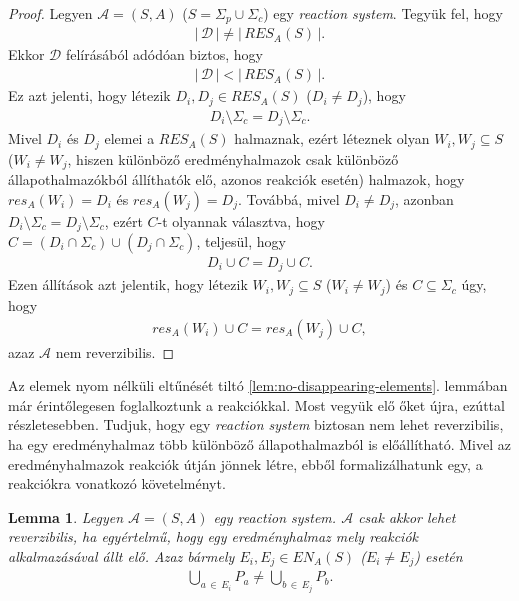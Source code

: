 \documentclass[12pt]{article}
\theoremstyle{definition}
\theoremstyle{remark}
\theoremstyle{plain}
\theoremstyle{remark}
\theoremstyle{plain}
\newtheorem{lemma}{Lemma}
\newcommand{\res}{\textit{res}}
\begin{document}
    \begin{proof}
        Legyen $\mathscr{A} = (S, A)$ ($S = \Sigma_{p} \cup \Sigma_{c}$) egy \textit{reaction system}. Tegyük fel, hogy 
        \begin{align*}
            |\,\mathcal{D}\,| \neq |\,\textit{RES}_{A}(S)\,|.
        \end{align*}
        Ekkor $\mathcal{D}$ felírásából adódóan biztos, hogy
        \begin{align*}
            |\,\mathcal{D}\,| < |\,\textit{RES}_{A}(S)\,|.
        \end{align*}
        Ez azt jelenti, hogy létezik $D_{i}, D_{j} \in \textit{RES}_{A}(S)$ ($D_{i} \neq D_{j}$), hogy
        \begin{align*}
            D_{i} \setminus \Sigma_{c} = D_{j} \setminus \Sigma_{c}.
        \end{align*}
        Mivel $D_{i}$ és $D_{j}$ elemei a $\textit{RES}_{A}(S)$ halmaznak, ezért léteznek olyan $W_{i}, W_{j} \subseteq S$ ($W_{i} \neq W_{j}$, hiszen különböző eredményhalmazok csak különböző állapothalmazókból állíthatók elő, azonos reakciók esetén) halmazok, hogy $\res_{A}(W_{i}) = D_{i}$ és $\res_{A}(W_{j}) = D_{j}$. Továbbá, mivel $D_{i} \neq D_{j}$, azonban $D_{i} \setminus \Sigma_{c} = D_{j} \setminus \Sigma_{c}$, ezért $C$-t olyannak választva, hogy $C = (D_{i} \cap \Sigma_{c}) \cup (D_{j} \cap \Sigma_{c})$, teljesül, hogy
        \begin{align*}
            D_{i} \cup C = D_{j} \cup C.
        \end{align*}
        Ezen állítások azt jelentik, hogy létezik $W_{i}, W_{j} \subseteq S$ ($W_{i} \neq W_{j}$) és $C \subseteq \Sigma_{c}$ úgy, hogy
        \begin{align*}
            \res_{A}(W_{i}) \cup C = \res_{A}(W_{j}) \cup C,
        \end{align*}
        azaz $\mathscr{A}$ nem reverzibilis.
    \end{proof}     

    Az elemek nyom nélküli eltűnését tiltó \ref{lem:no-disappearing-elements}. lemmában már érintőlegesen foglalkoztunk a reakciókkal. Most vegyük elő őket újra, ezúttal részletesebben. Tudjuk, hogy egy \textit{reaction system} biztosan nem lehet reverzibilis, ha egy eredményhalmaz több különböző állapothalmazból is előállítható. Mivel az eredményhalmazok reakciók útján jönnek létre, ebből formalizálhatunk egy, a reakciókra vonatkozó követelményt.

    \begin{lemma}\label{lem:unique-products}
        Legyen $\mathscr{A} = (S, A)$ egy \textit{reaction system}. $\mathscr{A}$ csak akkor lehet reverzibilis, ha egyértelmű, hogy egy eredményhalmaz mely reakciók alkalmazásával állt elő. Azaz bármely $E_{i}, E_{j} \in \textit{EN}_{A}(S)$ ($E_{i} \neq E_{j}$) esetén
        \begin{align*}
            \bigcup\limits_{a \,\in\, E_{i}} P_{a} \neq \bigcup\limits_{b \,\in\, E_{j}} P_{b}.
        \end{align*}
    \end{lemma}
\end{document}
